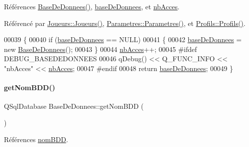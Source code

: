 Références \hyperlink{class_base_de_donnees_ac4d0c514f439b3a19dc35c159955373a}{Base\+De\+Donnees()}, \hyperlink{class_base_de_donnees_a822ba0b7cf85b1e48ced8efd3d65e266}{base\+De\+Donnees}, et \hyperlink{class_base_de_donnees_a5099ecb2922bb31d84cd5d4505298a29}{nb\+Acces}.



Référencé par \hyperlink{class_joueurs_ac0f9bfbacdcda2622d7438d0445200e8}{Joueurs\+::\+Joueurs()}, \hyperlink{class_parametres_a5197a69e0f07e253e6119b4af95344f4}{Parametres\+::\+Parametres()}, et \hyperlink{class_profils_abe936fbdac7c189d93aca3fcd8f6c7e6}{Profils\+::\+Profils()}.


\begin{DoxyCode}
00039 \{    
00040     \textcolor{keywordflow}{if} (\hyperlink{class_base_de_donnees_a822ba0b7cf85b1e48ced8efd3d65e266}{baseDeDonnees} == NULL)
00041     \{
00042         \hyperlink{class_base_de_donnees_a822ba0b7cf85b1e48ced8efd3d65e266}{baseDeDonnees} = \textcolor{keyword}{new} \hyperlink{class_base_de_donnees_ac4d0c514f439b3a19dc35c159955373a}{BaseDeDonnees}();
00043     \}
00044     \hyperlink{class_base_de_donnees_a5099ecb2922bb31d84cd5d4505298a29}{nbAcces}++;
00045 \textcolor{preprocessor}{    #ifdef DEBUG\_BASEDEDONNEES}
00046     qDebug() << Q\_FUNC\_INFO << \textcolor{stringliteral}{"nbAcces"} << \hyperlink{class_base_de_donnees_a5099ecb2922bb31d84cd5d4505298a29}{nbAcces};
00047 \textcolor{preprocessor}{    #endif}
00048     \textcolor{keywordflow}{return} \hyperlink{class_base_de_donnees_a822ba0b7cf85b1e48ced8efd3d65e266}{baseDeDonnees};    
00049 \}
\end{DoxyCode}
\mbox{\label{class_base_de_donnees_a467909531ae3cdebaf173f6e97cdc624}} 
\paragraph{\texorpdfstring{get\+Nom\+B\+D\+D()}{getNomBDD()}}
{\footnotesize\ttfamily Q\+Sql\+Database Base\+De\+Donnees\+::get\+Nom\+B\+DD (\begin{DoxyParamCaption}{ }\end{DoxyParamCaption})\hspace{0.3cm}{\ttfamily [private]}}



Références \hyperlink{class_base_de_donnees_a67c1d973c267a8f5fd6d7461550faa11}{nom\+B\+DD}.



